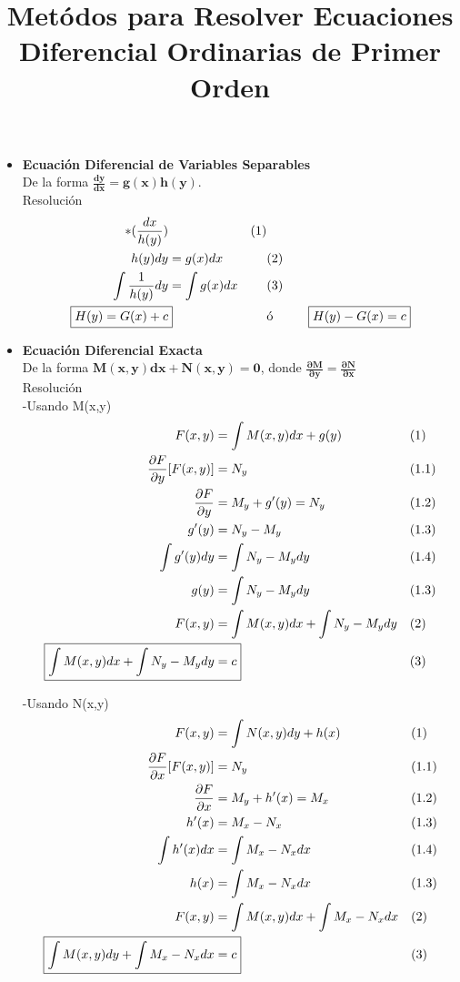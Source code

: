 \documentclass{article}
\title{Metódos para Resolver Ecuaciones Diferencial Ordinarias de Primer Orden}
\begin{document}
\maketitle

\begin{itemize}
    \item \textbf{Ecuación Diferencial de Variables Separables} \\
    De la forma $\boldsymbol{\frac{dy}{dx} = g(x)h(y)}$. \\
    Resolución
    \begin{align*}
        [ \frac{dy}{dx} & = g(x)h(y) ]*(\frac{dx}{h(y)}) &&\text{(1)}\\
        h(y)dy & = g(x)dx &&\text{(2)}\\
        \int \frac{1}{h(y)} dy & = \int g(x)dx &&\text{(3)}\\
        \Aboxed{ H(y) = G(x) + c } &&\text{ó} && \Aboxed{ H(y) - G(x) = c }
    \end{align*}
    
    \item \textbf{Ecuación Diferencial Exacta} \\
    De la forma $\boldsymbol{M(x,y)dx + N(x,y) = 0}$, donde 
    \textbf{$\boldsymbol{\frac{\partial M}{\partial y} = \frac{\partial N}{\partial x}}$} \\
    Resolución \\
    -Usando M(x,y)
    \begin{align*}
        F(x,y) & = \int M(x,y) dx + g(y) &&\text{(1)}\\
        \frac{\partial F}{\partial y}[F(x,y)] & = N_y &&\text{(1.1)}\\
        \frac{\partial F}{\partial y} & = M_y + g'(y) = N_y &&\text{(1.2)}\\
        g'(y) & = N_y - M_y &&\text{(1.3)}\\
        \int g'(y) dy & = \int N_y - M_y dy &&\text{(1.4)}\\
        g(y) & = \int N_y - M_y dy &&\text{(1.3)}\\
        F(x,y) & = \int M(x,y) dx + \int N_y - M_y dy &&\text{(2)}\\
        \Aboxed{ \int M(x,y) dx + \int N_y - M_y dy & = c } &&\text{(3)}
    \end{align*}

    -Usando N(x,y)
    \begin{align*}
        F(x,y) & = \int N(x,y) dy + h(x) &&\text{(1)}\\
        \frac{\partial F}{\partial x}[F(x,y)] & = N_y &&\text{(1.1)}\\
        \frac{\partial F}{\partial x} & = M_y + h'(x) = M_x &&\text{(1.2)}\\
        h'(x) & = M_x - N_x &&\text{(1.3)}\\
        \int h'(x) dx & = \int M_x - N_x dx &&\text{(1.4)}\\
        h(x) & = \int M_x - N_x dx &&\text{(1.3)}\\
        F(x,y) & = \int M(x,y) dx + \int M_x - N_x dx &&\text{(2)}\\
        \Aboxed{ \int M(x,y) dy + \int M_x - N_x dx & = c } &&\text{(3)}
    \end{align*}


\end{itemize}
\end{document}
